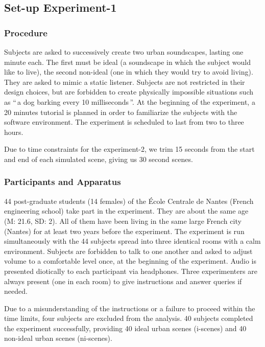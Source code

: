 \documentclass[twoside,twocolumn]{article}
\begin{document}
\subsection{Set-up Experiment-1}
\subsubsection*{Procedure}

Subjects are asked to successively create two urban soundscapes, lasting one minute each. The first must be ideal (a soundscape in which the subject would like to live), the second non-ideal (one in which they would try to avoid living). They are asked to mimic a static listener. Subjects are not restricted in their design choices, but are forbidden to create physically impossible situations such as ``\,a dog barking every 10 milliseconds\,''. At the beginning of the experiment, a 20 minutes tutorial is planned in order to familiarize the subjects with the software environment. The experiment is scheduled to last from two to three hours.

Due to time constraints for the experiment-2, we trim 15 seconds from the start and end of each simulated scene, giving us 30 second scenes.

\subsubsection*{Participants and Apparatus}

44 post-graduate students (14 females) of the {\'E}cole Centrale de Nantes (French engineering school) take part in the experiment. They are about the same age (M: 21.6, SD: 2). All of them have been living in the same large French city (Nantes) for at least two years before the experiment. The experiment is run simultaneously with the 44 subjects spread into three identical rooms with a calm environment. Subjects are forbidden to talk to one another and asked to adjust volume to a comfortable level once, at the beginning of the experiment. Audio is presented diotically to each participant via headphones. Three experimenters are always present (one in each room) to give instructions and answer queries if needed.

Due to a misunderstanding of the instructions or a failure to proceed within the time limits, four subjects are excluded from the analysis. 40 subjects completed the experiment successfully, providing 40 ideal urban scenes (i-scenes) and 40 non-ideal urban scenes (ni-scenes). 
\end{document}
